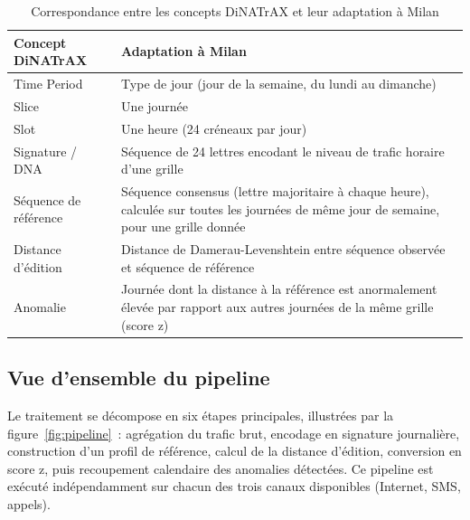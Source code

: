 \begin{table}[htbp]
  \centering
  \caption{Correspondance entre les concepts DiNATrAX et leur adaptation à Milan}
  \label{tab:dinatrax-mapping}
  \begin{tabular}{lp{7.5cm}}
    \toprule
    \textbf{Concept DiNATrAX} & \textbf{Adaptation à Milan} \\
    \midrule
    Time Period & Type de jour (jour de la semaine, du lundi au dimanche) \\
    Slice       & Une journée \\
    Slot        & Une heure (24 créneaux par jour) \\
    Signature / DNA & Séquence de 24 lettres encodant le niveau de trafic horaire d'une grille \\
    Séquence de référence & Séquence consensus (lettre majoritaire à chaque heure), calculée sur toutes les journées de même jour de semaine, pour une grille donnée \\
    Distance d'édition & Distance de Damerau-Levenshtein entre séquence observée et séquence de référence \\
    Anomalie & Journée dont la distance à la référence est anormalement élevée par rapport aux autres journées de la même grille (score z) \\
    \bottomrule
  \end{tabular}
\end{table}

\subsection{Vue d'ensemble du pipeline}

Le traitement se décompose en six étapes principales, illustrées par
la figure~\ref{fig:pipeline}~: agrégation du trafic brut, encodage en
signature journalière, construction d'un profil de référence, calcul
de la distance d'édition, conversion en score z, puis recoupement
calendaire des anomalies détectées. Ce pipeline est exécuté
indépendamment sur chacun des trois canaux disponibles (Internet,
SMS, appels).

